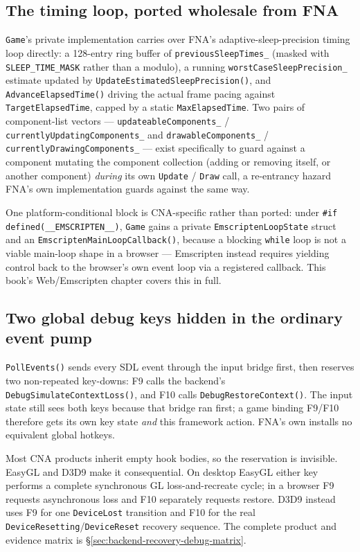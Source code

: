 \subsection{The timing loop, ported wholesale from FNA}

\texttt{Game}'s private implementation carries over FNA's adaptive-sleep-precision timing
loop directly: a 128-entry ring buffer of \texttt{previousSleepTimes\_} (masked with
\texttt{SLEEP\_TIME\_MASK} rather than a modulo), a running
\texttt{worstCaseSleepPrecision\_} estimate updated by \texttt{UpdateEstimatedSleepPrecision()},
and \texttt{AdvanceElapsedTime()} driving the actual frame pacing against
\texttt{TargetElapsedTime}, capped by a static \texttt{MaxElapsedTime}. Two pairs of
component-list vectors --- \texttt{updateableComponents\_} / \texttt{currentlyUpdatingComponents\_}
and \texttt{drawableComponents\_} / \texttt{currentlyDrawingComponents\_} --- exist specifically
to guard against a component mutating the component collection (adding or removing itself, or
another component) \emph{during} its own \texttt{Update} / \texttt{Draw} call, a re-entrancy
hazard FNA's own implementation guards against the same way.

One platform-conditional block is CNA-specific rather than ported: under
\texttt{\#if defined(\_\_EMSCRIPTEN\_\_)}, \texttt{Game} gains a private
\texttt{EmscriptenLoopState} struct and an \texttt{EmscriptenMainLoopCallback()}, because a
blocking \texttt{while} loop is not a viable main-loop shape in a browser --- Emscripten
instead requires yielding control back to the browser's own event loop via a registered
callback. This book's Web/Emscripten chapter covers this in full.

\subsection{Two global debug keys hidden in the ordinary event pump}

\texttt{PollEvents()} sends every SDL event through the input bridge first, then reserves two
non-repeated key-downs: F9 calls the backend's
\texttt{DebugSimulateContextLoss()}, and F10 calls \texttt{DebugRestoreContext()}. The input
state still sees both keys because that bridge ran first; a game binding F9/F10 therefore
gets its own key state \emph{and} this framework action. FNA's own  installs no
equivalent global hotkeys.

Most CNA products inherit empty hook bodies, so the reservation is invisible. EasyGL and
D3D9 make it consequential. On desktop EasyGL either key performs a complete synchronous GL
loss-and-recreate cycle; in a browser F9 requests asynchronous loss and F10 separately
requests restore. D3D9 instead uses F9 for one
\texttt{DeviceLost} transition and F10 for the real
\texttt{DeviceResetting}/\texttt{DeviceReset} recovery sequence. The complete product and
evidence matrix is \S\ref{sec:backend-recovery-debug-matrix}.

